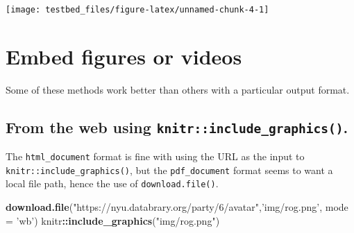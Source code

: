 \documentclass[]{article}
\newenvironment{Shaded}{\begin{snugshade}}{\end{snugshade}}
\newcommand{\DataTypeTok}[1]{\textcolor[rgb]{0.13,0.29,0.53}{#1}}
\newcommand{\KeywordTok}[1]{\textcolor[rgb]{0.13,0.29,0.53}{\textbf{#1}}}
\newcommand{\NormalTok}[1]{#1}
\newcommand{\OperatorTok}[1]{\textcolor[rgb]{0.81,0.36,0.00}{\textbf{#1}}}
\newcommand{\StringTok}[1]{\textcolor[rgb]{0.31,0.60,0.02}{#1}}
\begin{document}
\begin{center}\texttt{[image: testbed\_files/figure-latex/unnamed-chunk-4-1]} \end{center}

\hypertarget{embed-figures-or-videos}{%
\section{Embed figures or videos}\label{embed-figures-or-videos}}

Some of these methods work better than others with a particular output
format.

\hypertarget{from-the-web-using-knitrinclude_graphics.}{%
\subsection{\texorpdfstring{From the web using
\texttt{knitr::include\_graphics()}.}{From the web using knitr::include\_graphics().}}\label{from-the-web-using-knitrinclude_graphics.}}

The \texttt{html\_document} format is fine with using the URL as the
input to \texttt{knitr::include\_graphics()}, but the
\texttt{pdf\_document} format seems to want a local file path, hence the
use of \texttt{download.file()}.

\begin{Shaded}
\begin{Highlighting}[]
\KeywordTok{download.file}\NormalTok{(}\StringTok{"https://nyu.databrary.org/party/6/avatar"}\NormalTok{,}\StringTok{'img/rog.png'}\NormalTok{, }\DataTypeTok{mode =} \StringTok{'wb'}\NormalTok{)}
\NormalTok{knitr}\OperatorTok{::}\KeywordTok{include_graphics}\NormalTok{(}\StringTok{"img/rog.png"}\NormalTok{)}
\end{Highlighting}
\end{Shaded}
\end{document}
